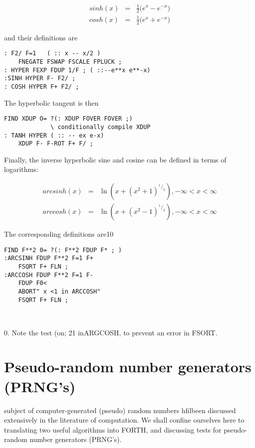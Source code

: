 \begin{eqnarray*}
    sinh(x) & = & \frac{1}{2}\Big(e^x-e^{-x}\Big)\label{hyp_eqn} \\
    cosh(x) & = & \frac{1}{2}\Big(e^x+e^{-x}\Big) 
\end{eqnarray*}


and their definitions are

\begin{verbatim}
: F2/ F=1   ( :: x -- x/2 ) 
    FNEGATE FSWAP FSCALE FPLUCK ;
: HYPER FEXP FDUP 1/F ; ( ::--e**x e**-x)
:SINH HYPER F- F2/ ;
: COSH HYPER F+ F2/ ;
\end{verbatim}

The hyperbolic tangent is then

\begin{verbatim}
FIND XDUP O= ?(: XDUP FOVER FOVER ;)
             \ conditionally compile XDUP
: TANH HYPER ( :: -- ex e-x)
    XDUP F- F-ROT F+ F/ ;
\end{verbatim}

Finally, the inverse hyperbolic sine and cosine can be defined in
terms of logarithms:

\begin{eqnarray*}
    arcsinh(x) & = & \ln{(x + (x^2 + 1)^{^1/_2})} , -\infty < x < \infty \\
    arccosh(x) & = & \ln{(x + (x^2 - 1)^{^1/_2})} , -\infty < x < \infty
\end{eqnarray*}

The corresponding definitions are10

\begin{verbatim}
FIND F**2 0= ?(: F**2 FDUP F* ; )
:ARCSINH FDUP F**2 F=1 F+
    FSQRT F+ FLN ;
:ARCCOSH FDUP F**2 F=1 F-
    FDUP F0<
    ABORT" x <1 in ARCCOSH"
    FSQRT F+ FLN ;

 
\end{verbatim}

0. Note the test (on; 21 inARGCOSH, to prevent an error in FSORT.



\section{Pseudo-random number generators (PRNG's)}
 subject of computer-generated (pseudo) random numbers
hfilbeen discussed extensively in the literature of computation. We shall
confine ourselves here to translating two useful
algorithms into FORTH, and discussing tests for pseudo-random
number generators (PRNG’s).

